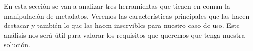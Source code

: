 En esta sección se van a analizar tres herramientas que tienen en común la manipulación de metadatos. Veremos las características principales que las hacen destacar y también lo que las hacen inservibles para nuestro caso de uso. Este análisis nos será útil para valorar los requisitos que queremos que tenga nuestra solución.
